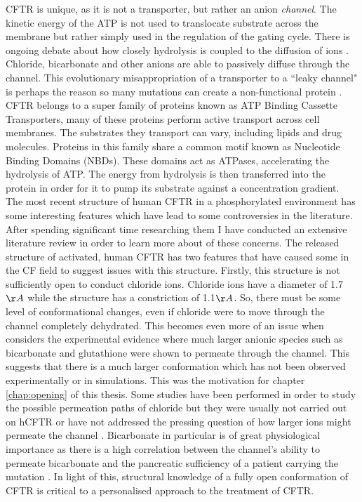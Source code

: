 CFTR is unique, as it is not a transporter, but rather an anion \textit{channel}. The kinetic energy of the ATP is not used to translocate substrate across the membrane but rather simply used in the regulation of the gating cycle. There is ongoing debate about how closely hydrolysis is coupled to the diffusion of ions \cite{}. Chloride, bicarbonate and other anions are able to passively diffuse through the channel. This evolutionary misappropriation of a transporter to a ``leaky channel" is perhaps the reason so many mutations can create a non-functional protein \cite{depristo2005,linsdell2018}.
CFTR belongs to a super family of proteins known as ATP Binding Cassette Transporters,  many of these proteins perform active transport across cell membranes. The substrates they transport can vary, including lipids and drug molecules. Proteins in this family share a common motif known as Nucleotide Binding Domains (NBDs). These domains act as ATPases, accelerating the hydrolysis of ATP. The energy from hydrolysis is then transferred into the protein in order for it to pump its substrate against a concentration gradient. 
The most recent structure of human CFTR in a phosphorylated environment has some interesting features which have lead to some controversies in the literature. After spending significant time researching them I have conducted an extensive literature review in order to learn more about of these concerns. The released structure of activated, human CFTR has two features that have caused some in the CF field to suggest issues with this structure. Firstly, this structure is not sufficiently open to conduct chloride ions. Chloride ions have a diameter of 1.7$\AA$ while the structure has a constriction of 1.1$\AA$\cite{zhang2018}. So, there must be some level of conformational changes, even if chloride were to move through the channel completely dehydrated. This becomes even more of an issue when considers the experimental evidence where much larger anionic species such as bicarbonate and glutathione were shown to permeate through the channel\cite{kogan2003}. This suggests that there is a much larger conformation which has not been observed experimentally or in simulations. This was the motivation for chapter \ref{chap:opening} of this thesis. Some studies have been performed in order to study the possible permeation paths of chloride but they were usually not carried out on hCFTR or have not addressed the pressing question of how larger ions might permeate the channel \cite{farkas2020, zeng2021}. Bicarbonate in particular is of great physiological importance as there is a high correlation between the channel's ability to permeate bicarbonate and the pancreatic sufficiency of a patient carrying the mutation \cite{}. In light of this, structural knowledge of a fully open conformation of CFTR is critical to a personalised approach to the treatment of CFTR.

